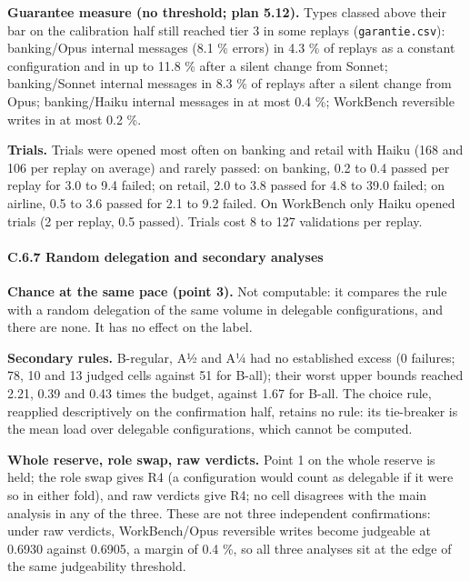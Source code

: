 \textbf{Guarantee measure (no threshold; plan 5.12).} Types classed above their bar on the calibration half still reached tier 3 in some replays (\texttt{garantie.\allowbreak{}csv}): banking/Opus internal messages (8.1 \% errors) in 4.3 \% of replays as a constant configuration and in up to 11.8 \% after a silent change from Sonnet; banking/Sonnet internal messages in 8.3 \% of replays after a silent change from Opus; banking/Haiku internal messages in at most 0.4 \%; WorkBench reversible writes in at most 0.2 \%.

\textbf{Trials.} Trials were opened most often on banking and retail with Haiku (168 and 106 per replay on average) and rarely passed: on banking, 0.2 to 0.4 passed per replay for 3.0 to 9.4 failed; on retail, 2.0 to 3.8 passed for 4.8 to 39.0 failed; on airline, 0.5 to 3.6 passed for 2.1 to 9.2 failed. On WorkBench only Haiku opened trials (2 per replay, 0.5 passed). Trials cost 8 to 127 validations per replay.

\paragraph{C.6.7 Random delegation and secondary analyses}\label{c.6.7-random-delegation-and-secondary-analyses}

\textbf{Chance at the same pace (point 3).} Not computable: it compares the rule with a random delegation of the same volume in delegable configurations, and there are none. It has no effect on the label.

\textbf{Secondary rules.} B-regular, A½ and A¼ had no established excess (0 failures; 78, 10 and 13 judged cells against 51 for B-all); their worst upper bounds reached 2.21, 0.39 and 0.43 times the budget, against 1.67 for B-all. The choice rule, reapplied descriptively on the confirmation half, retains no rule: its tie-breaker is the mean load over delegable configurations, which cannot be computed.

\textbf{Whole reserve, role swap, raw verdicts.} Point 1 on the whole reserve is held; the role swap gives R4 (a configuration would count as delegable if it were so in either fold), and raw verdicts give R4; no cell disagrees with the main analysis in any of the three. These are not three independent confirmations: under raw verdicts, WorkBench/Opus reversible writes become judgeable at 0.6930 against 0.6905, a margin of 0.4 \%, so all three analyses sit at the edge of the same judgeability threshold.

